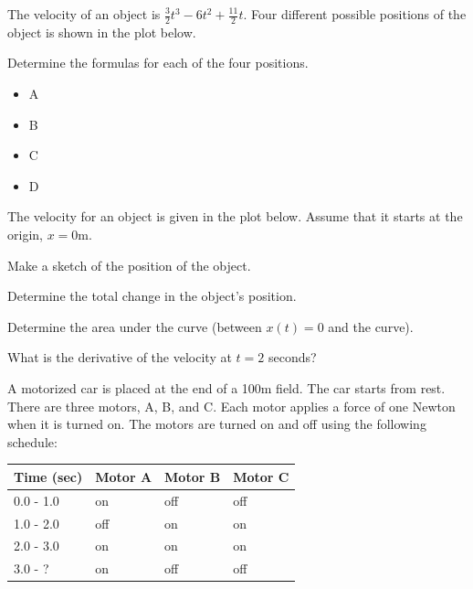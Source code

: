 \begin{problem}
\item The velocity of an object is
  $\frac{3}{2}t^3-6t^2+\frac{11}{2}t$. Four different possible
  positions of the object is shown in the plot below.

  \scalebox{0.7}{}

  \begin{subproblem}
    \item Determine the formulas for each of the four positions.
      \begin{itemize}
      \item A
        \vfill
      \item B
        \vfill
      \item C
        \vfill
      \item D
        \vfill
      \end{itemize}
  \end{subproblem}

  \clearpage

\item The velocity for an object is given in the plot below. Assume
  that it starts at the origin, $x=0$m.

  \scalebox{0.7}{}

  \begin{subproblem}
    \item Make a sketch of the position of the object.
    \item Determine the total change in the object's position.
      \vfill
    \item Determine the area under the curve (between $x(t)=0$ and the
      curve).
      \vfill
    \item What is the derivative of the velocity at $t=2$ seconds?
      \vspace{1em}
  \end{subproblem}

  \clearpage

\item A motorized car is placed at the end of a 100m field. The car
  starts from rest. There are three motors, A, B, and C. Each motor
  applies a force of one Newton when it is turned on. The motors are
  turned on and off using the following schedule: \\
  \begin{tabular}{l|lll}
    Time (sec) & Motor A & Motor B & Motor C \\ \hline
    0.0 - 1.0  & on      & off     & off     \\ 
    1.0 - 2.0  & off     & on      & on      \\ 
    2.0 - 3.0  & on      & on      & on      \\ 
    3.0 - ?    & on      & off     & off     
  \end{tabular}


\end{problem}
